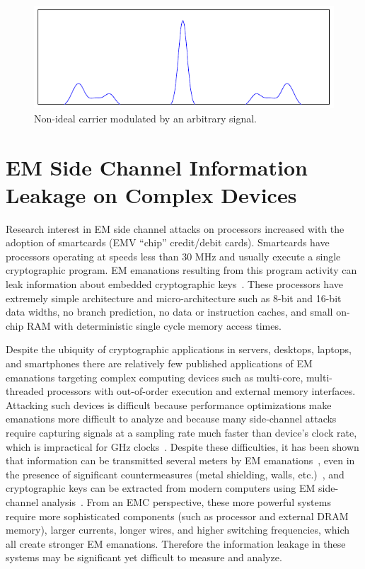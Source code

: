 \begin{figure}[thb]
  \centering
    \includegraphics[scale=.95]{../fase/Data/am_details_d.pdf}
  \caption{Non-ideal carrier modulated by an arbitrary signal.}
  \label{am_details_d}
\end{figure}

\section{EM Side Channel Information Leakage on Complex Devices}

Research interest in EM side channel attacks on processors increased with the adoption of smartcards (\eg EMV ``chip'' credit/debit cards). Smartcards have processors operating at speeds less than 30 MHz and usually execute a single cryptographic program. EM emanations resulting from this program activity can leak information about embedded cryptographic keys~\cite{Rao02, Olivier01}. These processors have extremely simple architecture and micro-architecture such as 8-bit and 16-bit data widths, no branch prediction, no data or instruction caches, and small on-chip RAM with deterministic single cycle memory access times.

Despite the ubiquity of cryptographic applications in servers, desktops, laptops, and smartphones there are relatively few published applications of EM emanations targeting complex computing devices such as multi-core, multi-threaded processors with out-of-order execution and external memory interfaces. Attacking such devices is difficult because performance optimizations make emanations more difficult to analyze and because many side-channel attacks require capturing signals at a sampling rate much faster than device's clock rate, which is impractical for GHz clocks~\cite{genkin_2014}. Despite these difficulties, it has been shown that information can be transmitted several meters by EM emanations~\cite{Durak1999}, even in the presence of significant countermeasures (metal shielding, walls, etc.)~\cite{Zajic14}, and cryptographic keys can be extracted from modern computers using EM side-channel analysis~\cite{genkin_2014}. From an EMC perspective, these more powerful systems require more sophisticated components (such as processor and external DRAM memory), larger currents, longer wires, and higher switching frequencies, which all create stronger EM emanations. Therefore the information leakage in these systems may be significant yet difficult to measure and analyze.

